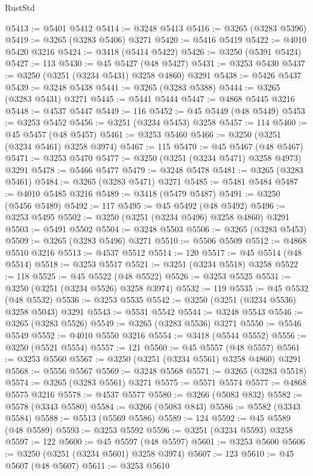 \begin{lexlean}{RustStd}
\begin{coremodule}
@5413 := @5401 @5412
@5414 := @3248 @5413
@5416 := @3265 (@3283 @5396)
@5419 := @3265 (@3283 @5406) @3271
@5420 := @5416 @5419
@5422 := @4010 @5420 @3216
@5424 := @3418 (@5414 @5422)
@5426 := @3250 (@5391 @5424)
@5427 := 113
@5430 := @45 @5427 (@48 @5427)
@5431 := @3253 @5430
@5437 := @3250 (@3251 (@3234 @5431) @3258 @4860) @3291
@5438 := @5426 @5437
@5439 := @3248 @5438
@5441 := @3265 (@3283 @5388)
@5444 := @3265 (@3283 @5431) @3271
@5445 := @5441 @5444
@5447 := @4868 @5445 @3216
@5448 := @4537 @5447
@5449 := 116
@5452 := @45 @5449 (@48 @5449)
@5453 := @3253 @5452
@5456 := @3251 (@3234 @5453) @3258
@5457 := 114
@5460 := @45 @5457 (@48 @5457)
@5461 := @3253 @5460
@5466 := @3250 (@3251 (@3234 @5461) @3258 @3974)
@5467 := 115
@5470 := @45 @5467 (@48 @5467)
@5471 := @3253 @5470
@5477 := @3250 (@3251 (@3234 @5471) @3258 @4973) @3291
@5478 := @5466 @5477
@5479 := @3248 @5478
@5481 := @3265 (@3283 @5461)
@5484 := @3265 (@3283 @5471) @3271
@5485 := @5481 @5484
@5487 := @4010 @5485 @3216
@5489 := @3418 (@5479 @5487)
@5491 := @3250 (@5456 @5489)
@5492 := 117
@5495 := @45 @5492 (@48 @5492)
@5496 := @3253 @5495
@5502 := @3250 (@3251 (@3234 @5496) @3258 @4860) @3291
@5503 := @5491 @5502
@5504 := @3248 @5503
@5506 := @3265 (@3283 @5453)
@5509 := @3265 (@3283 @5496) @3271
@5510 := @5506 @5509
@5512 := @4868 @5510 @3216
@5513 := @4537 @5512
@5514 := 120
@5517 := @45 @5514 (@48 @5514)
@5518 := @3253 @5517
@5521 := @3251 (@3234 @5518) @3258
@5522 := 118
@5525 := @45 @5522 (@48 @5522)
@5526 := @3253 @5525
@5531 := @3250 (@3251 (@3234 @5526) @3258 @3974)
@5532 := 119
@5535 := @45 @5532 (@48 @5532)
@5536 := @3253 @5535
@5542 := @3250 (@3251 (@3234 @5536) @3258 @5043) @3291
@5543 := @5531 @5542
@5544 := @3248 @5543
@5546 := @3265 (@3283 @5526)
@5549 := @3265 (@3283 @5536) @3271
@5550 := @5546 @5549
@5552 := @4010 @5550 @3216
@5554 := @3418 (@5544 @5552)
@5556 := @3250 (@5521 @5554)
@5557 := 121
@5560 := @45 @5557 (@48 @5557)
@5561 := @3253 @5560
@5567 := @3250 (@3251 (@3234 @5561) @3258 @4860) @3291
@5568 := @5556 @5567
@5569 := @3248 @5568
@5571 := @3265 (@3283 @5518)
@5574 := @3265 (@3283 @5561) @3271
@5575 := @5571 @5574
@5577 := @4868 @5575 @3216
@5578 := @4537 @5577
@5580 := @3266 (@5083 @832)
@5582 := @5578 (@3343 @5580)
@5584 := @3266 (@5083 @843)
@5586 := @5582 (@3343 @5584)
@5588 := @5513 (@5569 @5586)
@5589 := 124
@5592 := @45 @5589 (@48 @5589)
@5593 := @3253 @5592
@5596 := @3251 (@3234 @5593) @3258
@5597 := 122
@5600 := @45 @5597 (@48 @5597)
@5601 := @3253 @5600
@5606 := @3250 (@3251 (@3234 @5601) @3258 @3974)
@5607 := 123
@5610 := @45 @5607 (@48 @5607)
@5611 := @3253 @5610

\end{coremodule}
\end{lexlean}
